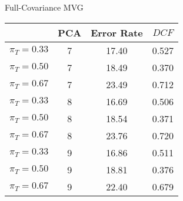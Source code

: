 \caption{Full-Covariance MVG}\label{tab:mvg_acctable}
\begin{center}
\begin{tabular}{|c|c||c|c|}
\hline
\ & PCA & Error Rate & $DCF$\\
\hline
$\pi_T = 0.33$ & 7 & 17.40 & 0.527 \\
$\pi_T = 0.50$ & 7 & 18.49 & 0.370 \\
$\pi_T = 0.67$ & 7 & 23.49 & 0.712 \\
\hline
$\pi_T = 0.33$ & 8 & 16.69 & 0.506 \\
$\pi_T = 0.50$ & 8 & 18.54 & 0.371 \\
$\pi_T = 0.67$ & 8 & 23.76 & 0.720 \\
\hline
$\pi_T = 0.33$ & 9 & 16.86 & 0.511 \\
$\pi_T = 0.50$ & 9 & 18.81 & 0.376 \\
$\pi_T = 0.67$ & 9 & 22.40 & 0.679 \\
\hline
\end{tabular}
\end{center}

